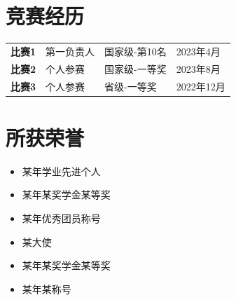 \documentclass[11pt]{article}
\begin{document}

    \section{\makebox[\widthof{\faTrophy}][c]{\color{SYSU_Green}{\faTrophy}}\quad 竞赛经历}
    \begin{table}[h!]
        \begin{tabularx}{\textwidth}{Xp{}p{}p{}}
            \textbf{比赛1} & 第一负责人 & 国家级-第10名 & 2023年4月 \\
            \textbf{比赛2} & 个人参赛 & 国家级-一等奖 & 2023年8月\\
            \textbf{比赛3} & 个人参赛 & 省级-一等奖 & 2022年12月\\
        \end{tabularx}
    \end{table}


\section{\makebox[\widthof{\faStar}][c]{\color{SYSU_Green}{\faStar}}\quad 所获荣誉}
\begin{minipage}[t]{0.48\textwidth}
    \begin{itemize}
        \item 某年学业先进个人
        \item 某年某奖学金某等奖
        \item 某年优秀团员称号
    \end{itemize}
\end{minipage}
\hfill
\begin{minipage}[t]{0.48\textwidth}
    \begin{itemize}
        \item 某大使
        \item 某年某奖学金某等奖
        \item 某年某称号
    \end{itemize}
\end{minipage}
\end{document}
